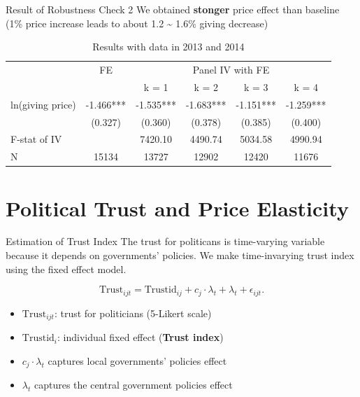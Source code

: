 \documentclass[
  ignorenonframetext,
]{beamer}
\providecommand{\tightlist}{%
  \setlength{\itemsep}{0pt}\setlength{\parskip}{0pt}}
\begin{document}
\begin{frame}{Result of Robustness Check 2}
\protect\hypertarget{result-of-robustness-check-2}{}
We obtained \textbf{stonger} price effect than baseline (1\% price
increase leads to about 1.2 \textasciitilde{} 1.6\% giving decrease)

\begin{table}

\caption{\label{tab:kableRobust2EstimateElasticity}Results with data in 2013 and 2014}
\centering
\fontsize{9}{11}\selectfont
\begin{tabular}[t]{lccccc}
\toprule
\multicolumn{1}{c}{ } & \multicolumn{1}{c}{FE} & \multicolumn{4}{c}{Panel IV with FE} \\
\cmidrule(l{3pt}r{3pt}){2-2} \cmidrule(l{3pt}r{3pt}){3-6}
 &  & k = 1 & k = 2 & k = 3 & k = 4\\
\midrule
ln(giving price) & -1.466*** & -1.535*** & -1.683*** & -1.151*** & -1.259***\\
 & (0.327) & (0.360) & (0.378) & (0.385) & (0.400)\\
F-stat of IV &  & 7420.10 & 4490.74 & 5034.58 & 4990.94\\
N & 15134 & 13727 & 12902 & 12420 & 11676\\
\bottomrule
\end{tabular}
\end{table}
\end{frame}

\hypertarget{political-trust-and-price-elasticity}{%
\section{Political Trust and Price
Elasticity}\label{political-trust-and-price-elasticity}}

\begin{frame}{Estimation of Trust Index}
\protect\hypertarget{estimation-of-trust-index}{}
The trust for politicans is time-varying variable because it depends on
governments' policies. We make time-invarying trust index using the
fixed effect model.

\[
    \text{Trust}_{ijt} = \text{Trustid}_{ij} + c_j \cdot \lambda_t + \lambda_t + \epsilon_{ijt}.
\]

\begin{itemize}
\tightlist
\item
  \(\text{Trust}_{ijt}\): trust for politicians (5-Likert scale)
\item
  \(\text{Trustid}_i\): individual fixed effect (\textbf{Trust index})
\item
  \(c_j \cdot \lambda_t\) captures local governments' policies effect
\item
  \(\lambda_t\) captures the central government policies effect
\end{itemize}
\end{frame}
\end{document}
